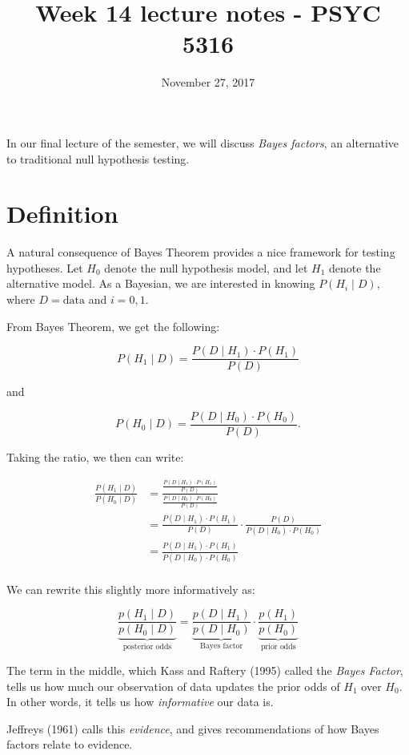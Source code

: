 \documentclass[11pt]{article}
\date{November 27, 2017}
\title{Week 14 lecture notes - PSYC 5316}
\begin{document}
\maketitle
In our final lecture of the semester, we will discuss \emph{Bayes factors}, an alternative to traditional null hypothesis testing.

\section*{Definition}
\label{sec-1}

A natural consequence of Bayes Theorem provides a nice framework for testing hypotheses.  Let $H_0$ denote the null hypothesis model, and let $H_1$ denote the alternative model.  As a Bayesian, we are interested in knowing $P(H_i\mid D)$, where $D=\mathrm{data}$ and $i=0,1$.

From Bayes Theorem, we get the following:

\[
P(H_1\mid D) = \frac{P(D\mid H_1) \cdot P(H_1)}{P(D)}
\]

and

\[
P(H_0\mid D) = \frac{P(D\mid H_0) \cdot P(H_0)}{P(D)}.
\]

Taking the ratio, we then can write:

\begin{align*}
\frac{P(H_1\mid D)}{P(H_0\mid D)} &= \frac{\frac{P(D\mid H_1) \cdot P(H_1)}{P(D)}}{\frac{P(D\mid H_0) \cdot P(H_0)}{P(D)}}\\
&= \frac{P(D\mid H_1) \cdot P(H_1)}{P(D)} \cdot \frac{P(D)}{P(D\mid H_0)\cdot P(H_0)} \\
&= \frac{P(D\mid H_1) \cdot P(H_1)}{P(D\mid H_0)\cdot P(H_0)}\\
\end{align*}

We can rewrite this slightly more informatively as:

\[
\underbrace{\frac{p(H_1 \mid D)}{p(H_0\mid D)}}_{\text{posterior odds}} = \underbrace{\frac{p(D\mid H_1)}{p(D\mid H_0)}}_{\text{Bayes factor}} \cdot \underbrace{\frac{p(H_1)}{p(H_0)}}_{\text{prior odds}}
\]

The term in the middle, which Kass and Raftery (1995) called the \emph{Bayes Factor}, tells us how much our observation of data updates the prior odds of $H_1$ over $H_0$.  In other words, it tells us how \emph{informative} our data is.

Jeffreys (1961) calls this \emph{evidence}, and gives recommendations of how Bayes factors relate to evidence.
\end{document}

